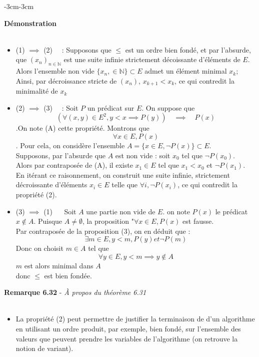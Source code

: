 \documentclass{article}
\newenvironment{demonstration}
{
    \begin{boite_demonstration}
    \textbf{\textcolor{rouge_fonce}{Démonstration}}\\ \\
}
{
    \end{boite_demonstration}
    \vspace{15pt}
}
\newenvironment{remarque}[2]
{
    \begin{boite_remarque}
    \textbf{\textcolor{bleu_fonce}{Remarque #1}} - \textit{#2} \\ \\
    \begin{itemize}[label=$\blacktriangleright \quad $ ]                    
}
{   
    \end{itemize}
    \end{boite_remarque}
    
}
\begin{document}
\begin{adjustwidth}{-3cm}{-3cm}
    \begin{demonstration}
        \begin{itemize}
            \item (1) $\implies$ (2) $\quad$: Supposons que $\leq$ est un ordre bien fondé, et par l'absurde, que $(x_n)_{n \in \mathbb{N}}$ est une suite infinie strictement décoissante d'éléments de $E$. Alors l'ensemble non vide $\{x_n, \in \mathbb{N}\} \subset E$ admet un élément minimal $x_k$; Ainsi, par décroissance stricte de $(x_n)$, $x_{k+1} < x_k$, ce qui contredit la minimalité de $x_k$
            \item (2) $\implies$ (3) $\quad$: Soit $P$ un prédicat sur $E$. On suppose que $$(\forall (x,y) \in E^2, y < x \implies P(y)) \quad \implies \quad P(x) $$.On note (A) cette propriété. Montrons que $$ \forall x \in E, P(x)$$. Pour cela, on considère l'ensemble $A = \{x \in E, \lnot P(x)\} \subset E$. \\ Supposons, par l'absurde que $A$ est non vide : soit $x_0$ tel que $\lnot P(x_0)$. \\ Alors par contraposée de (A), il existe $x_1 \in E$ tel que $x_1 < x_0$ et $\lnot P(x_1)$. \\En itérant ce raisonnement, on construit une suite infinie, strictement décroissante d'éléments $x_i \in E$ telle que $\forall i, \lnot P(x_i)$, ce qui contredit la propriété (2).
            \item (3) $\implies$ (1) $\quad$ Soit $A$ une partie non vide de $E$. on note $P(x)$ le prédicat $x \notin A$. Puisque $A \neq \emptyset$, la proposition "$\forall x \in E, P(x) $ est fausse. \\ Par contraposée de la proposition (3), on en déduit que : $$\exists m \in E, y<m, P(y) et \lnot P(m)$$ Donc on choisit $m \in A $ tel que $$\forall y \in E, y<m \implies y \notin A$$ $m$ est alors minimal dans $A$ \\ donc $\leq$ est bien fondée.
        \end{itemize}
    \end{demonstration}
    
        
        
        \begin{remarque}{6.32}{À propos du théorème 6.31}
            \item La propriété (2) peut permettre de justifier la terminaison de d'un algorithme en utilisant un ordre produit, par exemple, bien fondé, sur l'ensemble des valeurs que peuvent prendre les variables de l'algorithme (on retrouve la notion de variant).
        \end{remarque}


\end{adjustwidth}
\end{document}
